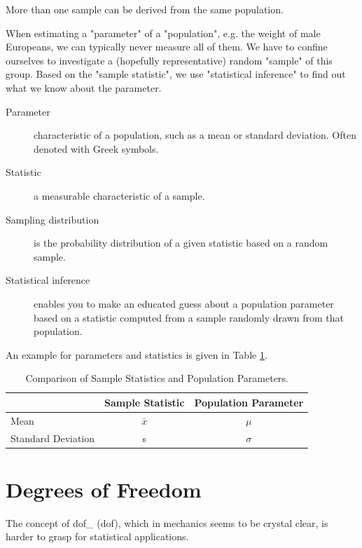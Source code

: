 More than one sample can be derived from the same population.

When estimating a "parameter" of a "population", e.g. the weight of male Europeans, we can typically never measure all of them. We have to confine ourselves to investigate a (hopefully representative) random "sample" of this group. Based on the "sample statistic", we use "statistical inference" to find out what we know about the parameter.

\begin{description}
  \item[Parameter] characteristic of a population, such as a mean or standard deviation. Often denoted with Greek symbols.
  \item[Statistic] a measurable characteristic of a sample.
  \item[Sampling distribution] is the probability distribution of a given statistic based on a random sample.
  \item[Statistical inference] enables you to make an educated guess about a population parameter based on a statistic computed from a sample randomly drawn from that population.
\end{description}

An example for parameters and statistics is given in Table \ref{table:population}.

\begin{table}[ht]

  \centering
    \begin{tabular}{|l|c|c|}
      \hline
       & Sample Statistic & Population Parameter \\
       \hline
      Mean & $\bar{x}$ & $\mu$ \\
      Standard Deviation & s & $\sigma$ \\
      \hline
    \end{tabular}
    \caption{Comparison of Sample Statistics and Population Parameters.}
    \label{table:population}
\end{table}

\section{Degrees of Freedom}\label{sec:DF}

The concept of \gls{dof_} (\acrshort{dof}), which in mechanics seems to be crystal clear, is harder to grasp for statistical applications.

